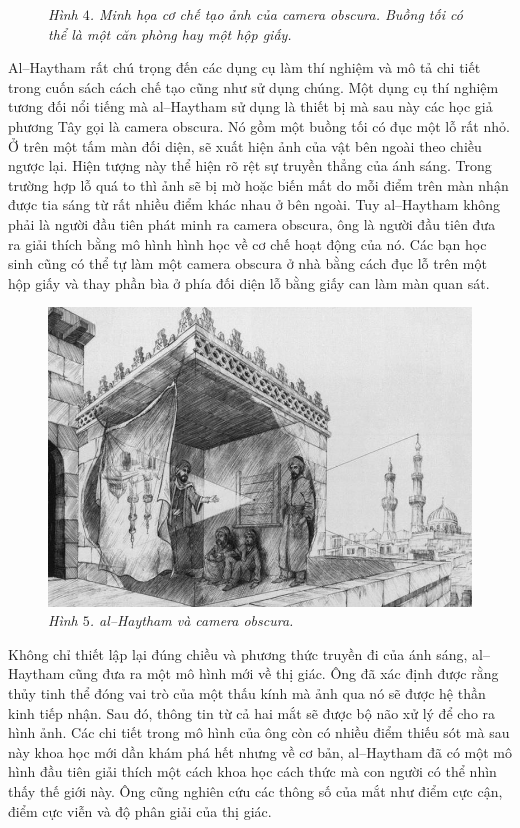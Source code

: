 \begin{multicols}{2}
\begin{figure}[H]
		\caption{\small\textit{\color{lichsutoanhoc}Hình $4$. Minh họa cơ chế tạo ảnh của camera obscura. Buồng tối có thể là một căn phòng hay một hộp giấy.}}
		\vspace*{-5pt}
	\end{figure}
	Al--Haytham rất chú trọng đến các dụng cụ làm thí nghiệm và mô tả chi tiết trong cuốn sách cách chế tạo cũng như sử dụng chúng. Một dụng cụ thí nghiệm tương đối nổi tiếng mà al--Haytham sử dụng là thiết bị mà sau này các học giả phương Tây gọi là camera obscura. Nó gồm một buồng tối có đục một lỗ rất nhỏ. Ở trên một tấm màn đối diện, sẽ xuất hiện ảnh của vật bên ngoài theo chiều ngược lại. Hiện tượng này thể hiện rõ rệt sự truyền thẳng của ánh sáng. Trong trường hợp lỗ quá to thì ảnh sẽ bị mờ hoặc biến mất do mỗi điểm trên màn nhận được tia sáng từ rất nhiều điểm khác nhau ở bên ngoài. Tuy al--Haytham không phải là người đầu tiên phát minh ra camera obscura, ông là người đầu tiên đưa ra giải thích bằng mô hình hình học về cơ chế hoạt động của nó. Các bạn học sinh cũng có thể tự làm một camera obscura ở nhà bằng cách đục lỗ trên một hộp giấy và thay phần bìa ở phía đối diện lỗ bằng giấy can làm màn quan sát.
	\begin{figure}[H]
		\vspace*{-5pt}
		\centering
		\captionsetup{labelformat= empty, justification=centering}
		\includegraphics[width= 1\linewidth]{6}
		\caption{\small\textit{\color{lichsutoanhoc}Hình $5$. al--Haytham và camera obscura.}}
		\vspace*{-10pt}
	\end{figure}
	Không chỉ thiết lập lại đúng chiều và phương thức truyền đi của ánh sáng, al--Haytham cũng đưa ra một mô hình mới về thị giác. Ông đã xác định được rằng thủy tinh thể đóng vai trò của một thấu kính mà ảnh qua nó sẽ được hệ thần kinh tiếp nhận. Sau đó, thông tin từ cả hai mắt sẽ được bộ não xử lý để cho ra hình ảnh. Các chi tiết trong mô hình của ông còn có nhiều điểm thiếu sót mà sau này khoa học mới dần khám phá hết nhưng về cơ bản, al--Haytham đã có một mô hình đầu tiên giải thích một cách khoa học cách thức mà con người có thể nhìn thấy thế giới này. Ông cũng nghiên cứu các thông số của mắt như điểm cực cận, điểm cực viễn và độ phân giải của thị giác.

\end{multicols}
